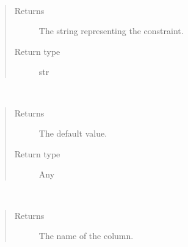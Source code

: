 \documentclass[letterpaper,10pt,english]{sphinxmanual}
\begin{document}
\begin{fulllineitems}
\begin{fulllineitems}
\label{\detokenize{model:simple_sql.model.column.Column.get_constraint}}~\begin{quote}\begin{description}
\item[{Returns}] \leavevmode
\sphinxAtStartPar
The string representing the constraint.

\item[{Return type}] \leavevmode
\sphinxAtStartPar
str

\end{description}\end{quote}

\end{fulllineitems}


\begin{fulllineitems}
\label{\detokenize{model:simple_sql.model.column.Column.get_default}}~\begin{quote}\begin{description}
\item[{Returns}] \leavevmode
\sphinxAtStartPar
The default value.

\item[{Return type}] \leavevmode
\sphinxAtStartPar
Any

\end{description}\end{quote}

\end{fulllineitems}


\begin{fulllineitems}
\label{\detokenize{model:simple_sql.model.column.Column.get_name}}~\begin{quote}\begin{description}
\item[{Returns}] \leavevmode
\sphinxAtStartPar
The name of the column.


\end{description}
\end{quote}
\end{fulllineitems}
\end{fulllineitems}
\end{document}
